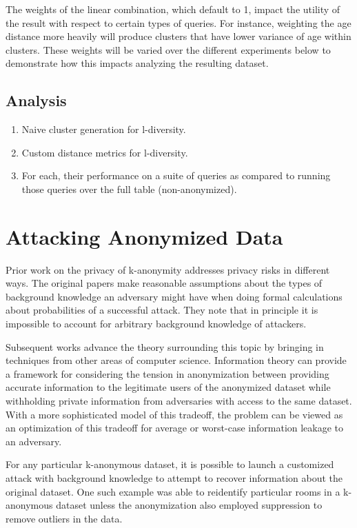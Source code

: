 The weights of the linear combination, which default to 1, impact the utility of the result with respect to certain types of queries. For instance, weighting the age distance more heavily will produce clusters that have lower variance of age within clusters. These weights will be varied over the different experiments below to demonstrate how this impacts analyzing the resulting dataset.

\subsection{Analysis}
\begin{enumerate}
    \item Naive cluster generation for l-diversity.
    \item Custom distance metrics for l-diversity.
    \item For each, their performance on a suite of queries as compared to running those queries over the full table (non-anonymized).
\end{enumerate}

\section{Attacking Anonymized Data}
Prior work on the privacy of k-anonymity addresses privacy risks in different ways. The original papers make reasonable assumptions about the types of background knowledge an adversary might have when doing formal calculations about probabilities of a successful attack. They note that in principle it is impossible to account for arbitrary background knowledge of attackers.

Subsequent works advance the theory surrounding this topic by bringing in techniques from other areas of computer science. Information theory can provide a framework for considering the tension in anonymization between providing accurate information to the legitimate users of the anonymized dataset while withholding private information from adversaries with access to the same dataset\cite{liuInfoTheory}. With a more sophisticated model of this tradeoff, the problem can be viewed as an optimization of this tradeoff for average or worst-case information leakage to an adversary\cite{duInfoTheory}.

For any particular k-anonymous dataset, it is possible to launch a customized attack with background knowledge to attempt to recover information about the original dataset. One such example \cite{schweeEval} was able to reidentify particular rooms in a k-anonymous dataset unless the anonymization also employed suppression to remove outliers in the data.

